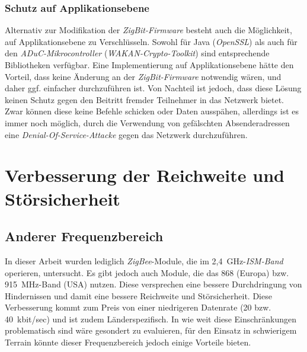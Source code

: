 \subsubsection{Schutz auf Applikationsebene}
Alternativ zur Modifikation der \emph{ZigBit-Firmware} besteht auch die Möglichkeit, auf Applikationsebene zu Verschlüsseln.
Sowohl für Java (\emph{OpenSSL}) als auch für den \emph{ADuC-Mikrocontroller} (\emph{WAKAN-Crypto-Toolkit}) sind 
entsprechende Bibliotheken
verfügbar. Eine Implementierung auf Applikationsebene hätte den Vorteil, dass keine Änderung an der \emph{ZigBit-Firmware}
notwendig wären, und daher ggf. einfacher durchzuführen ist. Von Nachteil ist jedoch, dass diese Lösung keinen Schutz
gegen den Beitritt fremder Teilnehmer in das Netzwerk bietet. Zwar können diese keine Befehle schicken oder Daten ausspähen,
allerdings ist es immer noch möglich, durch die Verwendung von gefälschten Absenderadressen eine 
\emph{Denial-Of-Service-Attacke} gegen das Netzwerk durchzuführen. 

\section{Verbesserung der Reichweite und Störsicherheit}
\subsection{Anderer Frequenzbereich}
In dieser Arbeit wurden lediglich \emph{ZigBee}-Module, die im 2,4~GHz-\emph{ISM-Band} operieren, untersucht. Es gibt
jedoch auch Module, die das 868 (Europa) bzw. 915~MHz-Band (USA) nutzen. Diese versprechen eine bessere Durchdringung
von Hindernissen und damit eine bessere Reichweite und Störsicherheit. Diese Verbesserung kommt zum Preis von einer
niedrigeren Datenrate (20 bzw. 40~kbit/sec) und ist zudem Länderspezifisch. In wie weit diese Einschränkungen problematisch
sind wäre gesondert zu evaluieren, für den Einsatz in schwierigem Terrain könnte dieser Frequenzbereich jedoch einige
Vorteile bieten.

